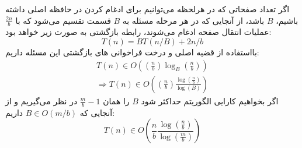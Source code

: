 \documentclass[]{article}
\begin{document}
اگر تعداد صفحاتی که در هرلحظه می‌توانیم برای ادغام کردن در حافظه اصلی داشته باشیم،
$B$ باشد، از آنجایی که در هر مرحله مسئله به $B$ قسمت تقسیم می‌شود که
با $\displaystyle \frac{2n}{b}$ عملیات انتقال صفحه ادغام می‌شوند، رابطه بازگشتی به صورت زیر خواهد بود:
$$T(n) = BT(n/B) + 2n/b$$
بااستفاده از قضیه اصلی و درخت فراخوانی های بازگشتی این مسئله داریم:
\begin{equation*}
\begin{split}
    T(n) \in O((\frac{n}{b}) \log_B(\frac{n}{b})) \\
    \Rightarrow T(n) \in O(\displaystyle (\frac{n}{b}) \frac{\log(\frac{n}{b})}{\log(B)})
\end{split}
\end{equation*}
اگر بخواهیم کارایی الگوریتم حداکثر شود $B$ را همان $\displaystyle \frac{m}{b} - 1$
در نظر می‌گیریم و از آنجایی که $B \in O(m/b)$ داریم:
$$T(n) \in O(\frac{n}{b} \frac{\log(\frac{n}{b})}{\log(\frac{m}{b})})$$
\end{document}
